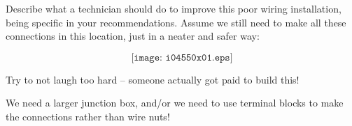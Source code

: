 

Describe what a technician should do to improve this poor wiring installation, being specific in your recommendations.  Assume we still need to make all these connections in this location, just in a neater and safer way:

$$\texttt{[image: i04550x01.eps]}$$

Try to not laugh too hard -- someone actually got paid to build this!







We need a larger junction box, and/or we need to use terminal blocks to make the connections rather than wire nuts! 










